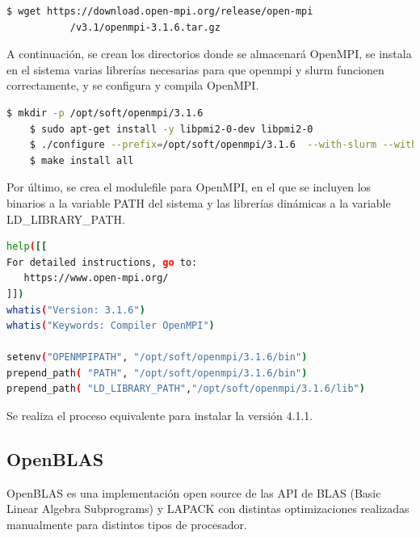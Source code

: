\vspace{4mm}

\begin{lstlisting}[language=bash]
    $ wget https://download.open-mpi.org/release/open-mpi
           /v3.1/openmpi-3.1.6.tar.gz
\end{lstlisting}
\vspace{4mm}

A continuación, se crean los directorios donde se almacenará OpenMPI, se instala en el sistema varias librerías necesarias para que openmpi y slurm funcionen correctamente, y se configura y compila OpenMPI.

\vspace{4mm}
\begin{lstlisting}[language=bash]
    $ mkdir -p /opt/soft/openmpi/3.1.6
    $ sudo apt-get install -y libpmi2-0-dev libpmi2-0
    $ ./configure --prefix=/opt/soft/openmpi/3.1.6  --with-slurm --with-pmi           --with-pmi-libdir=/usr/lib/x86_64-linux-gnu
    $ make install all
\end{lstlisting}
\vspace{4mm}

Por último, se crea el modulefile para OpenMPI, en el que se incluyen los binarios a la variable PATH del sistema y las librerías dinámicas a la variable LD\_LIBRARY\_PATH.
\vspace{4mm}

\begin{lstlisting}[language=bash,caption={Modulefile de OpenMPI},xleftmargin=.15\textwidth]
help([[
For detailed instructions, go to:
   https://www.open-mpi.org/
]])
whatis("Version: 3.1.6")
whatis("Keywords: Compiler OpenMPI")

setenv("OPENMPIPATH", "/opt/soft/openmpi/3.1.6/bin")
prepend_path( "PATH", "/opt/soft/openmpi/3.1.6/bin")
prepend_path( "LD_LIBRARY_PATH","/opt/soft/openmpi/3.1.6/lib")
\end{lstlisting}
\vspace{4mm}

Se realiza el proceso equivalente para instalar la versión 4.1.1.

\subsection{OpenBLAS}

OpenBLAS \cite{openblas} es una implementación open source de las API de BLAS (Basic Linear Algebra Subprograms) y LAPACK con distintas optimizaciones realizadas manualmente para distintos tipos de procesador.
\vspace{2mm}


